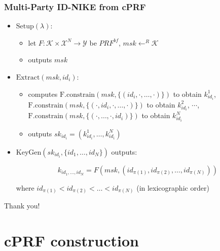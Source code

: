 \documentclass{beamer}
\begin{document}
\begin{frame}
\end{frame}

\begin{frame}
    \frametitle{Multi-Party ID-NIKE from cPRF}

\begin{itemize}
	\item $\mathrm{Setup}(\lambda)$:
		\begin{itemize}
			\item  let $F : \mathcal{K} \times \mathcal{X}^N \rightarrow \mathcal{Y}$ be $PRF^{bf}$, $msk \leftarrow^R \mathcal{K}$
			\item outputs $msk$
		\end{itemize}
	\item $\mathrm{Extract}(msk,id_i)$:
		\begin{itemize}
			\item  computes $\mathrm{F.constrain}(msk, \{(id_i, \cdot, \dots, \cdot)\})$ to obtain $k^{1}_{id_i}$, $\mathrm{F.constrain}(msk, \{(\cdot, id_i, \cdot, \dots, \cdot)\})$  to obtain $k^{2}_{id_i}$, $\cdots$,  $\mathrm{F.constrain}(msk, \{(\cdot, \dots, \cdot, id_i)\})$ to obtain $k^{N}_{id_i}$
			\item outputs $sk_{id_i} = (k^{1}_{id_i}, \dots, k^{N}_{id_i})$
		\end{itemize}
	\item $\mathrm{KeyGen}(sk_{id_i},\{id_1, \dots, id_N\})$ outputs:


\[ k_{id_1, \dots, id_N} = F(msk, (id_{\pi(1)}, id_{\pi(2)}, \dots, id_{\pi(N)})) \]

where $id_{\pi(1)} < id_{\pi(2)} < \dots < id_{\pi(N)}$ (in lexicographic order)

\end{itemize}

\end{frame}

\begin{frame}
\Huge{\centerline{Thank you!}}
\end{frame}


\section{cPRF construction}
\end{document}

